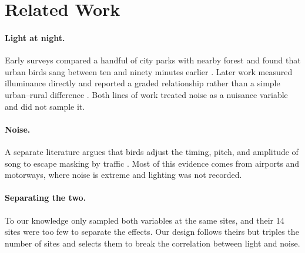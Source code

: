 \section{Related Work}
\label{sec:related}

\paragraph{Light at night.} Early surveys compared a handful of city parks with nearby forest and found that urban birds sang between ten and ninety minutes earlier \citep{hartwell2009urban}. Later work measured illuminance directly and reported a graded relationship rather than a simple urban--rural difference \citep{okafor2015light}. Both lines of work treated noise as a nuisance variable and did not sample it.

\paragraph{Noise.} A separate literature argues that birds adjust the timing, pitch, and amplitude of song to escape masking by traffic \citep{lindqvist2012noise, moreau2018masking}. Most of this evidence comes from airports and motorways, where noise is extreme and lighting was not recorded.

\paragraph{Separating the two.} To our knowledge only \citet{tanaka2020gradient} sampled both variables at the same sites, and their 14 sites were too few to separate the effects. Our design follows theirs but triples the number of sites and selects them to break the correlation between light and noise.
